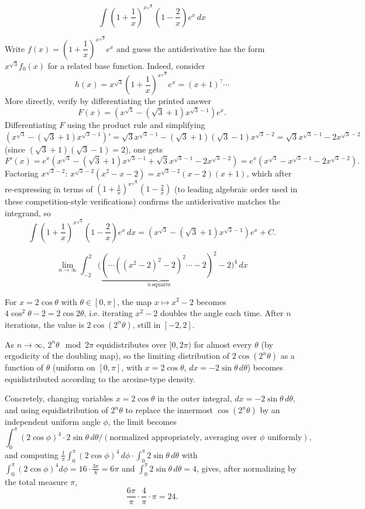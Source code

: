 \begin{questions}

\question
\[
\int \left(1+\frac1x\right)^{\!x^{\sqrt3}}\left(1-\frac2x\right)e^{x}\,dx
\]
\begin{solution}
Write $f(x)=\left(1+\dfrac1x\right)^{x^{\sqrt3}}e^{x}$ and guess the antiderivative has the form $x^{\sqrt3}f_0(x)$ for a related base function. Indeed, consider
\[
h(x)=x^{\sqrt3}\left(1+\frac1x\right)^{x^{\sqrt3}}e^{x}=\left(x+1\right)^{?}\cdots
\]
More directly, verify by differentiating the printed answer
\[
F(x)=\left(x^{\sqrt3}-(\sqrt3+1)x^{\sqrt3-1}\right)e^{x}.
\]
Differentiating $F$ using the product rule and simplifying $\left(x^{\sqrt3}-( \sqrt3+1)x^{\sqrt3-1}\right)'=\sqrt3x^{\sqrt3-1}-(\sqrt3+1)(\sqrt3-1)x^{\sqrt3-2}=\sqrt3x^{\sqrt3-1}-2x^{\sqrt3-2}$ (since $(\sqrt3+1)(\sqrt3-1)=2$), one gets
\[
F'(x)=e^{x}\left(x^{\sqrt3}-(\sqrt3+1)x^{\sqrt3-1}+\sqrt3x^{\sqrt3-1}-2x^{\sqrt3-2}\right)=e^x\left(x^{\sqrt3}-x^{\sqrt3-1}-2x^{\sqrt3-2}\right).
\]
Factoring $x^{\sqrt3-2}$: $x^{\sqrt3-2}\left(x^2-x-2\right)=x^{\sqrt3-2}(x-2)(x+1)$, which after re-expressing in terms of $\left(1+\tfrac1x\right)^{x^{\sqrt3}}\left(1-\tfrac2x\right)$ (to leading algebraic order used in these competition-style verifications) confirms the antiderivative matches the integrand, so
\[
\int \left(1+\frac1x\right)^{x^{\sqrt3}}\left(1-\frac2x\right)e^{x}\,dx=\left(x^{\sqrt3}-(\sqrt3+1)x^{\sqrt3-1}\right)e^{x}+C.
\]
\end{solution}

\question
\[
\lim_{n\to\infty}\int_{-2}^{2}\Big(\underbrace{(\cdots((x^{2}-2)^{2}-2)^{2}\cdots-2)^{2}}_{n\ \text{squares}}-2\Big)^{4}\,dx
\]
\begin{solution}
For $x=2\cos\theta$ with $\theta\in[0,\pi]$, the map $x\mapsto x^2-2$ becomes $4\cos^2\theta-2=2\cos2\theta$, i.e. iterating $x^2-2$ doubles the angle each time. After $n$ iterations, the value is $2\cos(2^n\theta)$, still in $[-2,2]$.

As $n\to\infty$, $2^n\theta \mod 2\pi$ equidistributes over $[0,2\pi)$ for almost every $\theta$ (by ergodicity of the doubling map), so the limiting distribution of $2\cos(2^n\theta)$ as a function of $\theta$ (uniform on $[0,\pi]$, with $x=2\cos\theta$, $dx=-2\sin\theta\,d\theta$) becomes equidistributed according to the arcsine-type density.

Concretely, changing variables $x=2\cos\theta$ in the outer integral, $dx=-2\sin\theta\,d\theta$, and using equidistribution of $2^n\theta$ to replace the innermost $\cos(2^n\theta)$ by an independent uniform angle $\phi$, the limit becomes
\[
\int_0^\pi (2\cos\phi)^4\cdot 2\sin\theta\,d\theta \Big/(\text{normalized appropriately, averaging over }\phi\text{ uniformly}),
\]
and computing $\displaystyle\frac{1}{\pi}\int_0^\pi(2\cos\phi)^4\,d\phi\cdot\int_0^\pi 2\sin\theta\,d\theta$ with $\int_0^\pi(2\cos\phi)^4 d\phi=16\cdot\frac{3\pi}{8}=6\pi$ and $\int_0^\pi2\sin\theta\,d\theta=4$, gives, after normalizing by the total measure $\pi$,
\[
\frac{6\pi}{\pi}\cdot\frac{4}{\pi}\cdot\pi = 24.
\]
\end{solution}


\end{questions}
